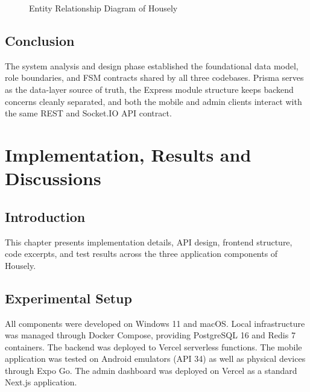 \documentclass[12pt,a4paper]{report}
\begin{document}
\begin{figure}[H]
\centering
\caption{Entity Relationship Diagram of Housely}
\label{fig:erd}
\end{figure}

\section{Conclusion}

The system analysis and design phase established the foundational data model, role
boundaries, and FSM contracts shared by all three codebases. Prisma serves as the
data-layer source of truth, the Express module structure keeps backend concerns cleanly
separated, and both the mobile and admin clients interact with the same REST and
Socket.IO API contract.

\chapter{Implementation, Results and Discussions}
\label{chap:impl}

\section{Introduction}

This chapter presents implementation details, API design, frontend structure, code
excerpts, and test results across the three application components of Housely.

\section{Experimental Setup}

All components were developed on Windows 11 and macOS. Local infrastructure was
managed through Docker Compose, providing PostgreSQL 16 and Redis 7 containers. The
backend was deployed to Vercel serverless functions. The mobile application was tested
on Android emulators (API 34) as well as physical devices through Expo Go. The admin
dashboard was deployed on Vercel as a standard Next.js application.
\end{document}
